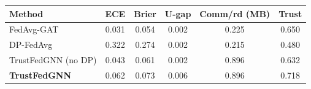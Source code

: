 \begin{tabular}{lccccc}
\toprule
Method & ECE & Brier & U-gap & Comm/rd (MB) & Trust \\
\midrule
FedAvg-GAT & 0.031 & 0.054 & 0.002 & 0.225 & 0.650 \\
DP-FedAvg & 0.322 & 0.274 & 0.002 & 0.215 & 0.480 \\
TrustFedGNN (no DP) & 0.043 & 0.061 & 0.002 & 0.896 & 0.632 \\
\textbf{TrustFedGNN} & 0.062 & 0.073 & 0.006 & 0.896 & 0.718 \\
\bottomrule
\end{tabular}
